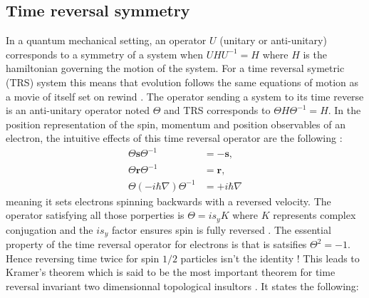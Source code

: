 \subsection{Time reversal symmetry}
In a quantum mechanical setting, an operator $U$ (unitary or anti-unitary) corresponds to a symmetry of a system when $U H U^{-1} = H$ where $H$ is the hamiltonian governing the motion of the system. For a time reversal symetric (TRS) system this means that evolution follows the same equations of motion as a movie of itself set on rewind \cite{shankar_topological_2018}. The operator sending a system to its time reverse is an anti-unitary operator noted $\Theta$ and TRS corresponds to $\Theta H \Theta^{-1} = H$. In the position representation of the spin, momentum and position observables of an electron, the intuitive effects of this time reversal operator are the following \cite{shankar_topological_2018} : 
\begin{align*}
    \Theta \mathbf{s} \Theta^{-1} &=-\mathbf{s}, \\
    \Theta \mathbf{r} \Theta^{-1} &=\mathbf{r}, \\
    \Theta (-i\hbar\nabla) \Theta^{-1} &=+i\hbar\nabla
\end{align*}
meaning it sets electrons spinning backwards with a reversed velocity. The operator satisfying all those porperties is $\Theta = i s_y K$ where $K$ represents complex conjugation and the $i s_y$ factor ensures spin is fully reversed \cite{bernevig_topological_2013}. The essential property of the time reversal operator for electrons is that is satsifies $\Theta^2 = -1$. Hence reversing time twice for spin $1/2$ particles isn't the identity \cite{hasan_topological_2010}! This leads to Kramer's theorem which is said to be the most important theorem for time reversal invariant two dimensionnal topological insultors \cite{bernevig_topological_2013}. It states the following:\\

\\[0.3cm]

